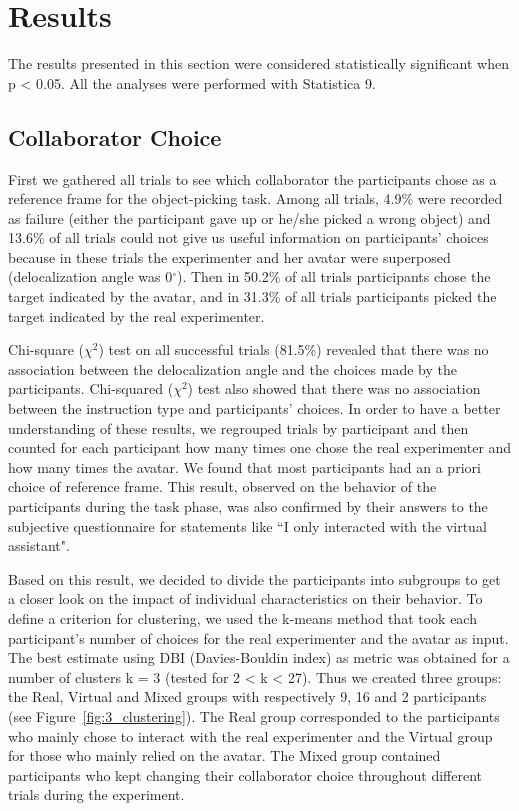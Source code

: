 
\section{Results}
The results presented in this section were considered statistically significant when p \textless{} 0.05. All the analyses were performed with Statistica 9.

\subsection{Collaborator Choice}
First we gathered all trials to see which collaborator the participants chose as a reference frame for the object-picking task. Among all trials, 4.9\% were recorded as failure (either the participant gave up or he/she picked a wrong object) and 13.6\% of all trials could not give us useful information on participants' choices because in these trials the experimenter and her avatar were superposed (delocalization angle was 0$^\circ$). Then in 50.2\% of all trials participants chose the target indicated by the avatar, and in 31.3\% of all trials participants picked the target indicated by the real experimenter.

Chi-square ($\chi^2$) test on all successful trials (81.5\%) revealed that there was no association between the delocalization angle and the choices made by the participants. Chi-squared ($\chi^2$) test also showed that there was no association between the instruction type and participants' choices. In order to have a better understanding of these results, we regrouped trials by participant and then counted for each participant how many times one chose the real experimenter and how many times the avatar. We found that most participants had an a priori choice of reference frame. This result, observed on the behavior of the participants during the task phase, was also confirmed by their answers to the subjective questionnaire for statements like ``I only interacted with the virtual assistant".

Based on this result, we decided to divide the participants into subgroups to get a closer look on the impact of individual characteristics on their behavior. To define a criterion for clustering, we used the k-means method that took each participant's number of choices for the real experimenter and the avatar as input. The best estimate using DBI (Davies-Bouldin index) as metric was obtained for a number of clusters k = 3 (tested for 2 \textless{} k \textless{} 27). Thus we created three groups: the Real, Virtual and Mixed groups with respectively 9, 16 and 2 participants (see Figure~\ref{fig:3_clustering}). The Real group corresponded to the participants who mainly chose to interact with the real experimenter and the Virtual group for those who mainly relied on the avatar. The Mixed group contained participants who kept changing their collaborator choice throughout different trials during the experiment.

